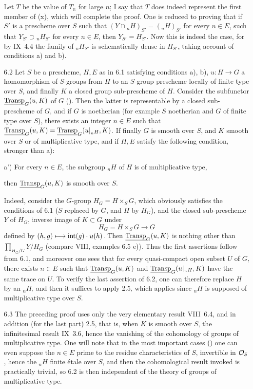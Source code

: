 Let $T$ be the value of $T_n$ for large $n$; I say that $T$ does indeed represent the first member of (x), which will complete the proof. One is reduced to proving that if $S'$ is a prescheme over $S$ such that $(Y\cap{}_nH)_{S'}=({}_nH)_{S'}$ for every $n\in E$, \ie such that $Y_{S'}\supset{}_nH_{S'}$ for every $n\in E$, then $Y_{S'}=H_{S'}$. Now this is indeed the case, for by IX~4.4 the family of ${}_nH_{S'}$ is schematically dense in $H_{S'}$, taking account of conditions a) and b).
\begin{theorem}{6.2}\label{XI.6.2}
Let $S$ be a prescheme, $H,E$ as in 6.1 satisfying conditions a), b), $u:H\to G$ a homomorphism of $S$-groups from $H$ to an $S$-group prescheme locally of finite type over $S$, and finally $K$ a closed group sub-prescheme of $H$. Consider the subfunctor $\underline{\operatorname{Transp}}_G(u,K)$ of $G$ (). Then the latter is representable by a closed sub-prescheme of $G$, and if $G$ is noetherian (for example $S$ noetherian and $G$ of finite type over $S$), there exists an integer $n\in E$ such that $\underline{\operatorname{Transp}}_G(u,K)=\underline{\operatorname{Transp}}_G(u|_{{}_nH},K)$. If finally $G$ is smooth over $S$, and $K$ smooth over $S$ or of multiplicative type, and if $H,E$ satisfy the following condition, stronger than a):

 a') For every $n\in E$, the subgroup ${}_nH$ of $H$ is of multiplicative type,

then $\underline{\operatorname{Transp}}_G(u,K)$ is smooth over $S$.
\end{theorem}
Indeed, consider the $G$-group $H_G=H\times_S G$, which obviously satisfies the conditions of 6.1 ($S$ replaced by $G$, and $H$ by $H_G$), and the closed sub-prescheme $Y$ of $H_G$, inverse image of $K\subset G$ under
\[
H_G=H\times_S G\to G
\]
defined by $(h,g)\longmapsto\operatorname{int}(g)\cdot u(h)$. Then $\underline{\operatorname{Transp}}_G(u,K)$ is nothing other than $\prod_{H_G/G}Y/H_G$ (compare VIII, examples 6.5 e)). Thus the first assertions follow from 6.1, and moreover one sees that for every quasi-compact open subset $U$ of $G$, there exists $n\in E$ such that $\underline{\operatorname{Transp}}_G(u,K)$ and $\underline{\operatorname{Transp}}_G(u|_{{}_nH},K)$ have the same trace on $U$. To verify the last assertion of 6.2, one can therefore replace $H$ by an ${}_nH$, and then it suffices to apply 2.5, which applies since ${}_nH$ is supposed of multiplicative type over $S$.
\begin{remark}{6.3}\label{XI.6.3}
The preceding proof uses only the very elementary result VIII~6.4, and in addition (for the last part) 2.5, that is, when $K$ is smooth over $S$, the infinitesimal result IX~3.6, hence the vanishing of the cohomology of groups of multiplicative type. One will note that in the most important cases () one can even suppose the $n\in E$ prime to the residue characteristics of $S$, \ie invertible in $\mathcal{O}_S$, hence the ${}_nH$ finite étale over $S$, and then the cohomological result invoked is practically trivial, so 6.2 is then independent of the theory of groups of multiplicative type.
\end{remark}

